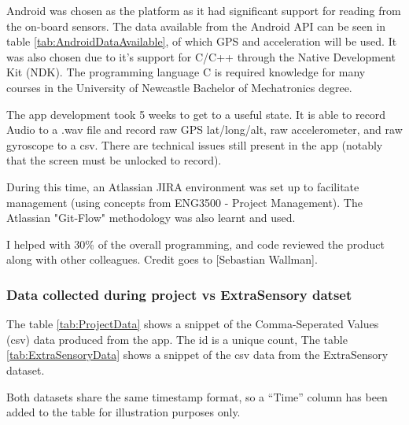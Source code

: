 \documentclass{UoNMCHA}
\newcommand{\citationneeded}{\textsuperscript{\color{blue} [citation needed]}}
\newcommand{\inlineQuote}[1]{``#1''}
\numberwithin{equation}{section}
\begin{document}
Android was chosen as the platform as it had significant support for reading from the on-board sensors. The data available from the Android API can be seen in table \ref{tab:AndroidDataAvailable}, of which GPS and acceleration will be used. It was also chosen due to it's support for C/C++ through the Native Development Kit (NDK). The programming language C is required knowledge for many courses in the University of Newcastle Bachelor of Mechatronics degree. 

The app development took 5 weeks to get to a useful state. It is able to record Audio to a .wav file and record raw GPS lat/long/alt, raw accelerometer, and raw gyroscope to a csv. There are technical issues still present in the app (notably that the screen must be unlocked to record).

During this time, an Atlassian JIRA environment was set up to facilitate management (using concepts from ENG3500 - Project Management). The Atlassian "Git-Flow" methodology was also learnt and used.

I helped with 30\% of the overall programming, and code reviewed the product along with other colleagues. Credit goes to [Sebastian Wallman].

\subsubsection{Data collected during project vs ExtraSensory datset}
The table \ref{tab:ProjectData} shows a snippet of the Comma-Seperated Values (csv) data produced from the app. The id is a unique count, %
The table \ref{tab:ExtraSensoryData} shows a snippet of the csv data from the ExtraSensory dataset. 

Both datasets share the same timestamp format, so a \inlineQuote{Time} column has been added to the table for illustration purposes only.

 
\end{document}
